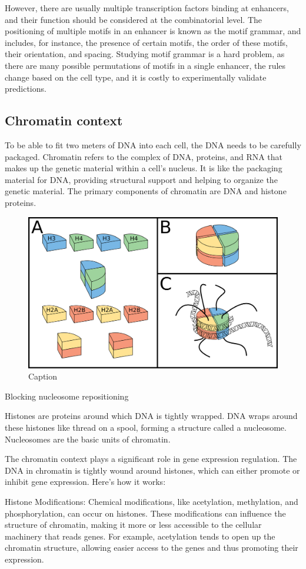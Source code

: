 However, there are usually multiple transcription factors binding at enhancers, and their function should be considered at the combinatorial level. The positioning of multiple motifs in an enhancer is known as the motif grammar, and includes, for instance, the presence of certain motifs, the order of these motifs, their orientation, and spacing. Studying motif grammar is a hard problem, as there are many possible permutations of motifs in a single enhancer, the rules change based on the cell type, and it is costly to experimentally validate predictions.

\subsection{Chromatin context}

To be able to fit two meters of DNA into each cell, the DNA needs to be carefully packaged. Chromatin refers to the complex of DNA, proteins, and RNA that makes up the genetic material within a cell's nucleus. It is like the packaging material for DNA, providing structural support and helping to organize the genetic material. The primary components of chromatin are DNA and histone proteins.

\begin{figure}[h]
    \center
    \includegraphics[width=0.55\linewidth]{ch.introduction/imgs/histones.png}
    \caption{Caption}
    \label{fig:histones}
\end{figure}

Blocking nucleosome repositioning

Histones are proteins around which DNA is tightly wrapped. DNA wraps around these histones like thread on a spool, forming a structure called a nucleosome. Nucleosomes are the basic units of chromatin.

The chromatin context plays a significant role in gene expression regulation. The DNA in chromatin is tightly wound around histones, which can either promote or inhibit gene expression. Here's how it works:

Histone Modifications: Chemical modifications, like acetylation, methylation, and phosphorylation, can occur on histones. These modifications can influence the structure of chromatin, making it more or less accessible to the cellular machinery that reads genes. For example, acetylation tends to open up the chromatin structure, allowing easier access to the genes and thus promoting their expression.

